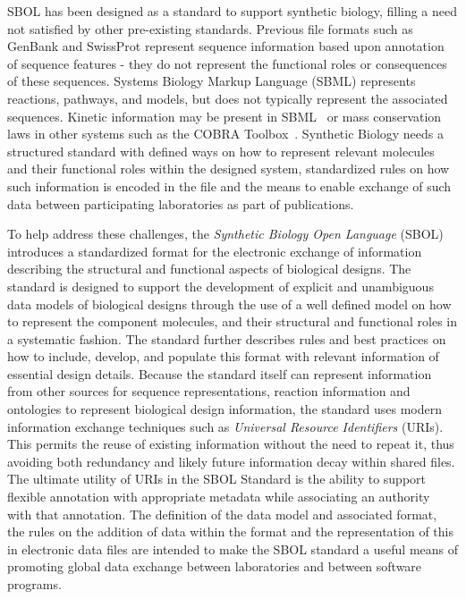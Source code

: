 SBOL has been designed as a standard to support synthetic biology, filling a need not satisfied by other pre-existing standards. Previous file formats such as GenBank and SwissProt represent sequence information based upon annotation of sequence features - they do not represent the functional roles or consequences of these sequences. Systems Biology Markup Language (SBML) represents reactions, pathways, and models, but does not typically represent the associated sequences.  Kinetic information may be present in SBML~\cite{SBML} or mass conservation laws in other systems such as the COBRA Toolbox~\cite{COBRA}. Synthetic Biology needs a structured standard with defined ways on how to represent relevant molecules and their functional roles within the designed system, standardized rules on how such information is encoded in the file and the means to enable exchange of such data between participating laboratories as part of publications. 

To help address these challenges, the \emph{Synthetic Biology Open Language} (SBOL) introduces a standardized format for the electronic exchange of information describing the structural and functional aspects of biological designs. 
The standard is designed to support the development of explicit and unambiguous data models of biological designs through the use of a well defined model on how to represent the component molecules, and their structural and functional roles in a systematic fashion. 
The standard further describes rules and best practices on how to include, develop, and populate this format with relevant information of essential design details. 
Because the standard itself can represent information from other sources for sequence representations, reaction information and ontologies to represent biological design information, the standard uses modern information exchange techniques such as \emph{Universal Resource Identifiers} (URIs). This permits the reuse of existing information without the need to repeat it, thus avoiding both redundancy and likely future information decay within shared files. 
The ultimate utility of URIs in the SBOL Standard is the ability to support flexible annotation with appropriate metadata while associating an authority with that annotation. 
The definition of the data model and associated format, the rules on the addition of data within the format and the representation of this in electronic data files are intended to make the SBOL standard a useful means of promoting global data exchange between laboratories and between software programs.

